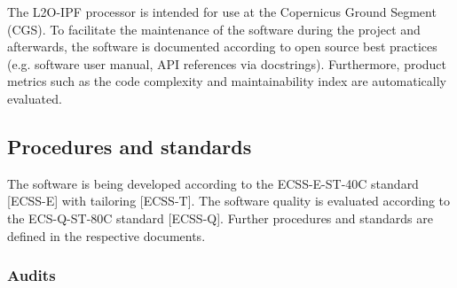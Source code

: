 The L2O-IPF processor is intended for use at the Copernicus Ground Segment (CGS). To facilitate the maintenance of the software during the project and afterwards, the software is documented according to open source best practices (e.g. software user manual, API references via docstrings). Furthermore, product metrics such as the code complexity and maintainability index are automatically evaluated.





















\subsection{Procedures and standards}

%
%
%
%
%
%
%
%
%
%
%
%
%
%
%
%
%
%
%
%
%

The software is being developed according to the ECSS-E-ST-40C standard [ECSS-E] with tailoring [ECSS-T]. The software quality is evaluated according to the ECS-Q-ST-80C standard [ECSS-Q]. Further procedures and standards are defined in the respective documents.

\subsubsection{Audits}
\label{subsec:audits}

